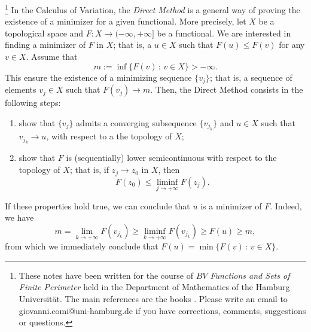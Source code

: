 \footnote{These notes have been written for the course of {\em $BV$ Functions and Sets of Finite Perimeter} held in the Department of Mathematics of the Hamburg Universität. The main references are the books \cite{AFP, evans2015measure, maggi2012sets}. Please write an email to giovanni.comi@uni-hamburg.de if you have corrections, comments, suggestions or questions.} In the Calculus of Variation, the {\em Direct Method} is a general way of proving the existence of a minimizer for a given functional. More precisely, let $X$ be a topological space and $F : X \to ( - \infty, + \infty]$ be a functional. We are interested in finding a minimizer of $F$ in $X$; that is, a $u \in X$ such that $F(u) \le F(v)$ for any $v \in X$. Assume that
\begin{equation*}
m := \inf \{ F(v) \, : \, v \in X\} > - \infty.
\end{equation*}
This ensure the existence of a minimizing sequence $\{v_{j}\}$; that is, a sequence of elements $v_{j} \in X$ such that $F(v_{j}) \to m$. Then, the Direct Method consists in the following steps:
\begin{enumerate}[(1)]
\item show that $\{v_{j}\}$ admits a converging subsequence $\{v_{j_{k}}\}$ and $u \in X$ such that $v_{j_{k}} \to u$, with respect to a the topology of $X$;
\item show that $F$ is (sequentially) lower semicontinuous with respect to the topology of $X$; that is, if $z_{j} \to z_{0}$ in $X$, then
$$ F(z_{0}) \le \liminf_{j \to + \infty} F(z_{j}).$$
\end{enumerate} 
If these properties hold true, we can conclude that $u$ is a minimizer of $F$. Indeed, we have
\begin{equation*}
m = \lim_{k \to + \infty} F(v_{j_{k}}) \ge \liminf_{k \to + \infty} F(v_{j_{k}}) \ge F(u) \ge m,
\end{equation*}
from which we immediately conclude that $F(u) = \min \{ F(v) \, : \, v \in X \}$.

